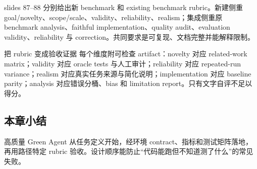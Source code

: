 slides 87--88 分别给出新 benchmark 和 existing benchmark rubric。新建侧重 goal/novelty、scope/scale、validity、reliability、realism；集成侧重原 benchmark analysis、faithful implementation、quality audit、evaluation validity、reliability 与 correction。共同要求是可复现、文档完整并能解释限制。


\begin{knowledgebox}{把 rubric 变成验收证据}
每个维度附可检查 artifact：novelty 对应 related-work matrix；validity 对应 oracle tests 与人工审计；reliability 对应 repeated-run variance；realism 对应真实任务来源与简化说明；implementation 对应 baseline parity；analysis 对应错误分桶、bias 和 limitation report。只有文字自评不足以得分。
\end{knowledgebox}

\subsection{本章小结}

高质量 Green Agent 从任务定义开始，经环境 contract、指标和测试矩阵落地，再用路径特定 rubric 验收。设计顺序能防止“代码能跑但不知道测了什么”的常见失败。

